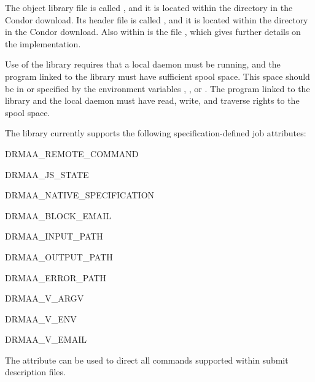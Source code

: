 The object library file is called ,
and it is located within
the  directory in the Condor download.
Its header file  is called , and it is located within
the  directory in the Condor download.
Also within  is the file
,
which gives further details on the implementation.

Use of the library requires that a
local  daemon  must be running,
and the program linked to the library must have
sufficient spool space.
This space should be in 
or specified by the environment variables
, , or .
The program linked to the library and the local  daemon
must have read, write, and traverse rights to the spool space.

The library currently supports the following specification-defined
job attributes:
\begin{description}
\item{DRMAA\_REMOTE\_COMMAND}
\item{DRMAA\_JS\_STATE}
\item{DRMAA\_NATIVE\_SPECIFICATION}
\item{DRMAA\_BLOCK\_EMAIL}
\item{DRMAA\_INPUT\_PATH}
\item{DRMAA\_OUTPUT\_PATH}
\item{DRMAA\_ERROR\_PATH}
\item{DRMAA\_V\_ARGV}
\item{DRMAA\_V\_ENV}
\item{DRMAA\_V\_EMAIL}
\end{description}

The attribute  can be used
to direct all commands supported within
submit description files.


